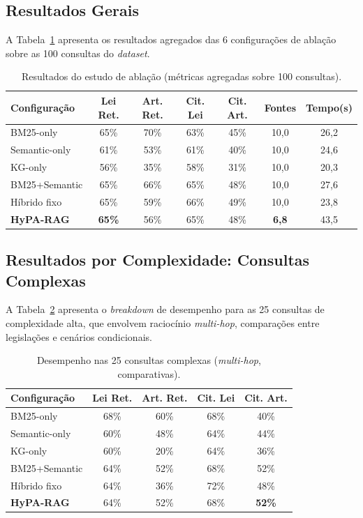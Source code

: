 \documentclass[12pt]{article}
\begin{document}
\subsection{Resultados Gerais}

A Tabela~\ref{tab:resultados_gerais} apresenta os resultados agregados das 6 configurações de ablação sobre as 100 consultas do \textit{dataset}.

\begin{table}[ht]
\centering
\caption{Resultados do estudo de ablação (métricas agregadas sobre 100 consultas).}
\label{tab:resultados_gerais}
\begin{tabular}{lcccccc}
\toprule
\textbf{Configuração} & \textbf{Lei Ret.} & \textbf{Art. Ret.} & \textbf{Cit. Lei} & \textbf{Cit. Art.} & \textbf{Fontes} & \textbf{Tempo(s)} \\
\midrule
BM25-only & 65\% & 70\% & 63\% & 45\% & 10,0 & 26,2 \\
Semantic-only & 61\% & 53\% & 61\% & 40\% & 10,0 & 24,6 \\
KG-only & 56\% & 35\% & 58\% & 31\% & 10,0 & 20,3 \\
BM25+Semantic & 65\% & 66\% & 65\% & 48\% & 10,0 & 27,6 \\
Híbrido fixo & 65\% & 59\% & 66\% & 49\% & 10,0 & 23,8 \\
\textbf{HyPA-RAG} & \textbf{65\%} & 56\% & 65\% & 48\% & \textbf{6,8} & 43,5 \\
\bottomrule
\end{tabular}
\end{table}

\subsection{Resultados por Complexidade: Consultas Complexas}

A Tabela~\ref{tab:complexas} apresenta o \textit{breakdown} de desempenho para as 25 consultas de complexidade alta, que envolvem raciocínio \textit{multi-hop}, comparações entre legislações e cenários condicionais.

\begin{table}[ht]
\centering
\caption{Desempenho nas 25 consultas complexas (\textit{multi-hop}, comparativas).}
\label{tab:complexas}
\begin{tabular}{lcccc}
\toprule
\textbf{Configuração} & \textbf{Lei Ret.} & \textbf{Art. Ret.} & \textbf{Cit. Lei} & \textbf{Cit. Art.} \\
\midrule
BM25-only & 68\% & 60\% & 68\% & 40\% \\
Semantic-only & 60\% & 48\% & 64\% & 44\% \\
KG-only & 60\% & 20\% & 64\% & 36\% \\
BM25+Semantic & 64\% & 52\% & 68\% & 52\% \\
Híbrido fixo & 64\% & 36\% & 72\% & 48\% \\
\textbf{HyPA-RAG} & 64\% & 52\% & 68\% & \textbf{52\%} \\
\bottomrule
\end{tabular}
\end{table}
\end{document}
